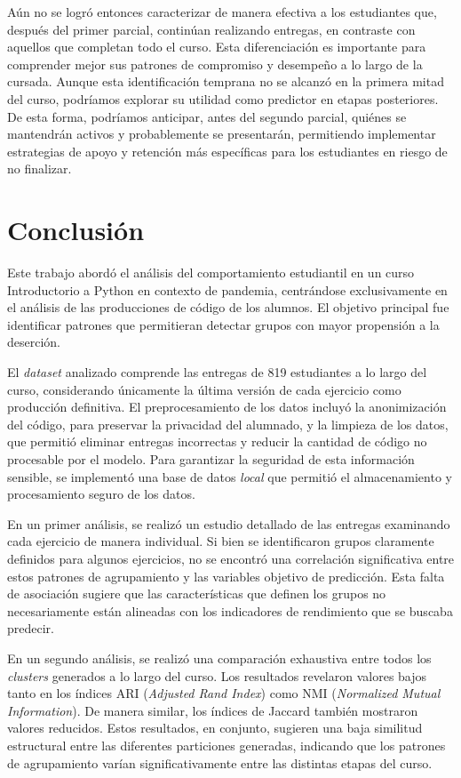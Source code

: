 \documentclass[11pt,a4paper,twoside,openany]{tesis}
\begin{document}
Aún no se logró entonces caracterizar de manera efectiva a los estudiantes que, después del primer parcial, continúan realizando entregas, en contraste con aquellos que completan todo el curso. Esta diferenciación es importante para comprender mejor sus patrones de compromiso y desempeño a lo largo de la cursada. Aunque esta identificación temprana no se alcanzó en la primera mitad del curso, podríamos explorar su utilidad como predictor en etapas posteriores. De esta forma, podríamos anticipar, antes del segundo parcial, quiénes se mantendrán activos y probablemente se presentarán, permitiendo implementar estrategias de apoyo y retención más específicas para los estudiantes en riesgo de no finalizar.

\chapter{Conclusión}

Este trabajo abordó el análisis del comportamiento estudiantil en un curso Introductorio a Python en contexto de pandemia, centrándose exclusivamente en el análisis de las producciones de código de los alumnos. El objetivo principal fue identificar patrones que permitieran detectar grupos con mayor propensión a la deserción.

El \emph{dataset} analizado comprende las entregas de 819 estudiantes a lo largo del curso, considerando únicamente la última versión de cada ejercicio como producción definitiva. El preprocesamiento de los datos incluyó la anonimización del código, para preservar la privacidad del alumnado, y la limpieza de los datos, que permitió eliminar entregas incorrectas y reducir la cantidad de código no procesable por el modelo. Para garantizar la seguridad de esta información sensible, se implementó una base de datos \emph{local} que permitió el almacenamiento y procesamiento seguro de los datos.

En un primer análisis, se realizó un estudio detallado de las entregas examinando cada ejercicio de manera individual. Si bien se identificaron grupos claramente definidos para algunos ejercicios, no se encontró una correlación significativa entre estos patrones de agrupamiento y las variables objetivo de predicción. Esta falta de asociación sugiere que las características que definen los grupos no necesariamente están alineadas con los indicadores de rendimiento que se buscaba predecir.

En un segundo análisis, se realizó una comparación exhaustiva entre todos los \emph{clusters} generados a lo largo del curso. Los resultados revelaron valores bajos tanto en los índices ARI (\emph{Adjusted Rand Index}) como NMI (\emph{Normalized Mutual Information}). De manera similar, los índices de Jaccard también mostraron valores reducidos. Estos resultados, en conjunto, sugieren una baja similitud estructural entre las diferentes particiones generadas, indicando que los patrones de agrupamiento varían significativamente entre las distintas etapas del curso.
\end{document}
